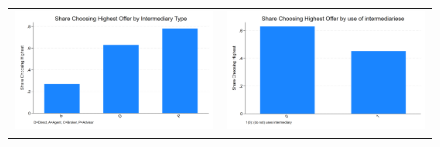 \documentclass[12pt]{article}
\begin{document}
 



   \begin{figure}[H]
\caption{}
 \label{fig:ie4_11}
\centering{}%
\begin{tabular}{cc}
\includegraphics[scale=0.27]{figures/IE4/IE4_highest_by_intermediary_type.png} 
& \includegraphics[scale=0.27]{figures/IE4/IE4_highest_by_intermediary_type(2).png} 
\end{tabular}
\end{figure} 
 


\end{document}
